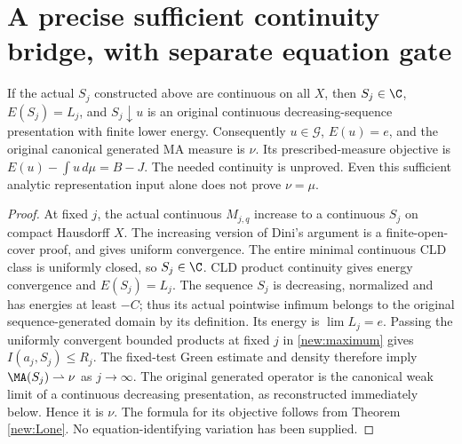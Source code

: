 \section{A precise sufficient continuity bridge, with separate equation gate}
\begin{proposition}\label{new:bridge}
If the actual $S_j$ constructed above are continuous on all $X$, then
$S_j\in\C$, $E(S_j)=L_j$, and $S_j\downarrow u$ is an original
continuous decreasing-sequence presentation with finite lower energy.
Consequently $u\in\mathcal G$, $E(u)=e$, and the original canonical
generated MA measure is $\nu$. Its prescribed-measure objective is
$E(u)-\int u\,d\mu=B-J$.
The needed continuity is unproved. Even this sufficient analytic
representation input alone does not prove $\nu=\mu$.
\end{proposition}
\begin{proof}
At fixed $j$, the actual continuous $M_{j,q}$ increase to a continuous
$S_j$ on compact Hausdorff $X$. The increasing version of Dini's
argument is a finite-open-cover proof, and gives uniform convergence.
The entire minimal continuous CLD class is uniformly closed, so
$S_j\in\C$. CLD product continuity gives energy convergence and
$E(S_j)=L_j$. The sequence $S_j$ is decreasing, normalized and has
energies at least $-C$; thus its actual pointwise infimum belongs to
the original sequence-generated domain by its definition. Its energy
is $\lim L_j=e$. Passing the uniformly convergent bounded products
at fixed $j$ in \eqref{new:maximum} gives $I(a_j,S_j)\le R_j$.
The fixed-test Green estimate and density therefore imply
$\MA(S_j)\rightharpoonup\nu$ as $j\to\infty$. The original generated
operator is the canonical weak limit of a continuous decreasing
presentation, as reconstructed immediately below. Hence it is $\nu$.
The formula for its objective follows from Theorem \ref{new:Lone}.
No equation-identifying variation has been supplied.
\end{proof}

